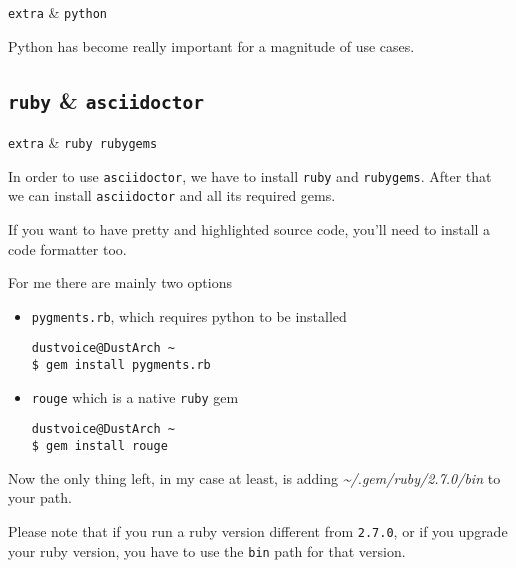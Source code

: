 \documentclass[10pt]{dustdoc}
\begin{document}
\begin{packagetable}
    \texttt{extra} & \texttt{python} \\
\end{packagetable}

Python has become really important for a magnitude of use cases.

\subsection{\texttt{ruby} \& \texttt{asciidoctor}}
\label{sec:ruby-and-asciidoctor}

\begin{packagetable}
    \texttt{extra} & \texttt{ruby rubygems} \\
\end{packagetable}

In order to use \texttt{asciidoctor}, we have to install \texttt{ruby} and \texttt{rubygems}.
After that we can install \texttt{asciidoctor} and all its required gems.

\begin{NOTE}
    If you want to have pretty and highlighted source code, you’ll need to install a code formatter too.

    For me there are mainly two options

    \begin{itemize}
        \item \texttt{pygments.rb}, which requires python to be installed

            \begin{verbatim}
dustvoice@DustArch ~
$ gem install pygments.rb
            \end{verbatim}

        \item \texttt{rouge} which is a native \texttt{ruby} gem

            \begin{verbatim}
dustvoice@DustArch ~
$ gem install rouge
            \end{verbatim}
    \end{itemize}
\end{NOTE}

Now the only thing left, in my case at least, is adding \textit{\~{}/.gem/ruby/2.7.0/bin} to your path.

\begin{NOTE}
    Please note that if you run a ruby version different from \texttt{2.7.0}, or if you upgrade your ruby version, you have to use the \texttt{bin} path for that version.
\end{NOTE}
\end{document}
